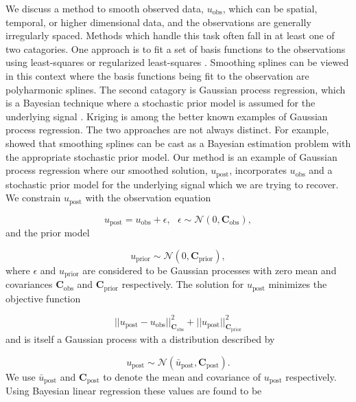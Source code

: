\documentclass[10pt,a4paper]{article}
\begin{document}
We discuss a method to smooth observed data, $u_\mathrm{obs}$, which can be spatial, temporal, or higher dimensional data, and the observations are generally irregularly spaced.  Methods which handle this task often fall in at least one of two catagories.  One approach is to fit a set of basis functions to the observations using least-squares or regularized least-squares \citep[e.g.][]{Fasshauer2007}.  Smoothing splines can be viewed in this context where the basis functions being fit to the observation are polyharmonic splines.  The second catagory is Gaussian process regression, which is a Bayesian technique where a stochastic prior model is assumed for the underlying signal \citep[e.g.][]{Rasmussen2006}.  Kriging is among the better known examples of Gaussian process regression.  The two approaches are not always distinct.  For example, \citet{Kimeldorf1970} showed that smoothing splines can be cast as a Bayesian estimation problem with the appropriate stochastic prior model.  Our method is an example of Gaussian process regression where our smoothed solution, $u_\mathrm{post}$, incorporates $u_\mathrm{obs}$ and a stochastic prior model for the underlying signal which we are trying to recover.  We constrain $u_\mathrm{post}$ with the observation equation

\begin{equation}\label{eq:Data}
  u_\mathrm{post} = u_\mathrm{obs} + \epsilon,\ \ \ \epsilon \sim \mathcal{N}(0,\mathbf{C}_\mathrm{obs}),
\end{equation}
and the prior model

\begin{equation}\label{eq:Prior}
  u_\mathrm{prior} \sim \mathcal{N}(0,\mathbf{C}_\mathrm{prior}),
\end{equation}
where $\epsilon$ and $u_\mathrm{prior}$ are considered to be Gaussian processes with zero mean and covariances $\mathbf{C}_\mathrm{obs}$ and $\mathbf{C}_\mathrm{prior}$ respectively.  The solution for $u_\mathrm{post}$ minimizes the objective function  

\begin{equation}\label{eq:Objective}
||u_\mathrm{post} - u_\mathrm{obs}||_{\mathbf{C}_\mathrm{obs}}^2 + 
||u_\mathrm{post}||_{\mathbf{C}_\mathrm{prior}}^2
\end{equation}
and is itself a Gaussian process with a distribution described by

\begin{equation}
  u_\mathrm{post} \sim \mathcal{N}(\bar{u}_\mathrm{post},\mathbf{C}_\mathrm{post}).
\end{equation}
We use $\bar{u}_\mathrm{post}$ and $\mathbf{C}_\mathrm{post}$ to denote the mean and covariance of $u_\mathrm{post}$ respectively.  Using Bayesian linear regression \citep[e.g.][]{Tarantola2005} these values are found to be  
\end{document}
